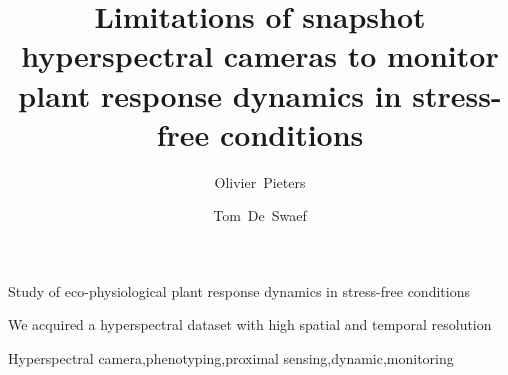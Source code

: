 \documentclass[10pt,authoryear,a4paper]{elsarticle}
\begin{document}
    \begin{frontmatter}

        \title{Limitations of snapshot hyperspectral cameras to monitor plant response dynamics in stress-free conditions}

        \author[a,b]{Olivier~Pieters}

        \author[b]{Tom~De~Swaef}


        \address[a]{IDLab-AIRO -- Ghent University -- imec, Technologiepark-Zwijnaarde 126, 9052 Zwijnaarde, Belgium}
        \address[b]{Plant Sciences Unit, Flanders Research Institute for Agriculture, Fisheries and Food, Caritasstraat 39, 9090 Melle, Belgium}

        \begin{abstract}
        \end{abstract}

        \begin{highlights}
            \item Study of eco-physiological plant response dynamics in stress-free conditions
            \item We acquired a hyperspectral dataset with high spatial and temporal resolution
        \end{highlights}

        \begin{keyword}
            Hyperspectral camera\sep phenotyping\sep proximal sensing\sep dynamic\sep monitoring 
        \end{keyword}

    \end{frontmatter}
\end{document}
